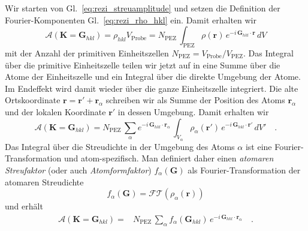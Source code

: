 Wir starten von Gl.~\ref{eq:rezi_streuamplitude} und setzen die Definition der Fourier-Komponenten Gl.~\ref{eq:rezi_rho_hkl} ein. Damit erhalten wir
\begin{equation}
\mathcal{A}(\mathbf{K} = \mathbf{G}_{hkl} ) 
=  \rho_{hkl} V_\text{Probe}
=  N_\text{PEZ} \, \int_\text{PEZ}    \rho(\mathbf{r})\,  e^{-i \, \mathbf{G}_{hkl} \cdot \mathbf{r}} \, dV 
\end{equation}
mit der Anzahl der primitiven Einheitszellen $ N_\text{PEZ} =  V_\text{Probe} / V_\text{PEZ}$.
Das Integral über die primitive Einheitszelle teilen wir jetzt auf in eine Summe über die Atome der Einheitszelle und ein Integral über die direkte Umgebung der Atome. Im Endeffekt wird damit wieder über die ganze Einheitszelle integriert. Die alte Ortskoordinate  $\mathbf{r} =  \mathbf{r}' +  \mathbf{r}_\alpha$ schreiben wir als Summe der Position des Atoms  $\mathbf{r}_\alpha$ und der lokalen Koordinate $\mathbf{r}'$ in dessen Umgebung. Damit erhalten wir
\begin{equation}
\mathcal{A}(\mathbf{K} = \mathbf{G}_{hkl} ) 
=    N_\text{PEZ}  \, 
\sum_\alpha e^{-i \, \mathbf{G}_{hkl} \cdot \mathbf{r}_\alpha} \, \int_{V_\alpha}  
 \rho_\alpha(\mathbf{r'})\,  e^{-i \, \mathbf{G}_{hkl} \cdot \mathbf{r'}} \, dV' \quad .
\end{equation}
Das Integral über die Streudichte in der Umgebung des Atoms $\alpha$ ist eine Fourier-Transformation und atom-spezifisch. Man definiert daher einen \emph{atomaren Streufaktor} (oder auch \emph{Atomformfaktor}) $f_\alpha ( \mathbf{G} )$ als Fourier-Transformation  der atomaren Streudichte
\begin{equation}
  f_\alpha ( \mathbf{G} ) = \mathcal{FT} (\rho_\alpha(\mathbf{r}))
\end{equation}
und erhält
\begin{align}
  \mathcal{A}(\mathbf{K} = \mathbf{G}_{hkl} ) 
  =  &
   N_\text{PEZ} \, 
  \sum_\alpha f_\alpha ( \mathbf{G}_{hkl} ) \, e^{-i \, \mathbf{G}_{hkl} \cdot \mathbf{r}_\alpha}   \quad .
  \end{align}

